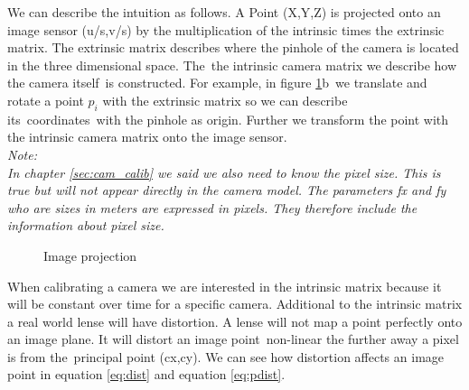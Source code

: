 \documentclass[11pt,a4paper,titlepage,oneside]{report}
\begin{document}
We can describe the intuition as follows. A Point (X,Y,Z) is projected onto an image sensor (u/s,v/s) by the multiplication of the intrinsic times the extrinsic matrix. The extrinsic matrix describes where the pinhole of the camera is located in the three dimensional space. The the intrinsic camera matrix we describe how the camera itself is constructed. For example, in figure \ref{fig:projection}b we translate and rotate a point $p_i$ with the extrinsic matrix so we can describe its coordinates with the pinhole as origin. Further we transform the point with the intrinsic camera matrix onto the image sensor.\\
\em
Note:\\
In chapter \ref{sec:cam_calib} we said we also need to know the pixel size. This is true but will not appear directly in the camera model. The parameters fx and fy who are sizes in meters are expressed in pixels. They therefore include the information about pixel size.
\normalfont

\begin{figure}[H]
	\centering
	\caption{Image projection}\label{fig:projection}
\end{figure}

When calibrating a camera we are interested in the intrinsic matrix because it will be constant over time for a specific camera. Additional to the intrinsic matrix a real world lense will have distortion. A lense will not map a point perfectly onto an image plane. It will distort an image point non-linear the further away a pixel is from the principal point (cx,cy). We can see how distortion affects an image point in equation \ref{eq:dist} and equation \ref{eq:pdist}.
\end{document}
